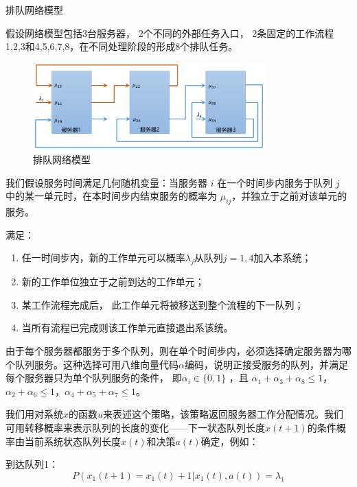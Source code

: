 \begin{example}
    排队网络模型

    假设网络模型包括3台服务器， 2个不同的外部任务入口， 2条固定的工作流程1,2,3和4,5,6,7,8，在不同处理阶段的形成8个排队任务。

    \begin{figure}[ht]
        \centering
        \includegraphics[width=0.8\textwidth]{pic/1.1.2.png}
        \caption{排队网络模型}
    \end{figure}

    我们假设服务时间满足几何随机变量：当服务器 $i$ 在一个时间步内服务于队列 $j$ 中的某一单元时，在本时间步内结束服务的概率为 $\mu _{ij}$，并独立于之前对该单元的服务。

    满足：
    \begin{enumerate}[itemsep=0pt,parsep=0pt]
        \item 任一时间步内，新的工作单元可以概率$\lambda_j$从队列$j=1,4$加入本系统；
        \item 新的工作单位独立于之前到达的工作单元；
        \item 某工作流程完成后， 此工作单元将被移送到整个流程的下一队列；
        \item 当所有流程已完成则该工作单元直接退出系该统。
    \end{enumerate}

    由于每个服务器都服务于多个队列，则在单个时间步内，必须选择确定服务器为哪个队列服务。这种选择可用八维向量代码$\alpha$编码，说明正接受服务的队列，并满足每个服务器只为单个队列服务的条件， 即$\alpha_i \in \{0,1\}$ ，且 $\alpha_1 +\alpha_3 +\alpha_8 \leq  1$，$\alpha_2 + \alpha_6 \leq 1$，$\alpha_4 + \alpha_5 + \alpha_7 \leq 1$。

    我们用对系统$x$的函数$u$来表述这个策略，该策略返回服务器工作分配情况。我们可用转移概率来表示队列的长度的变化——下一状态队列长度$x(t+1)$的条件概率由当前系统状态队列长度$x(t)$和决策$a(t)$确定，例如：

    到达队列1：
    \begin{equation}
        P(x_1(t+1)=x_1(t)+1|x_1(t),a(t))=\lambda_1
    \end{equation}


\end{example}
